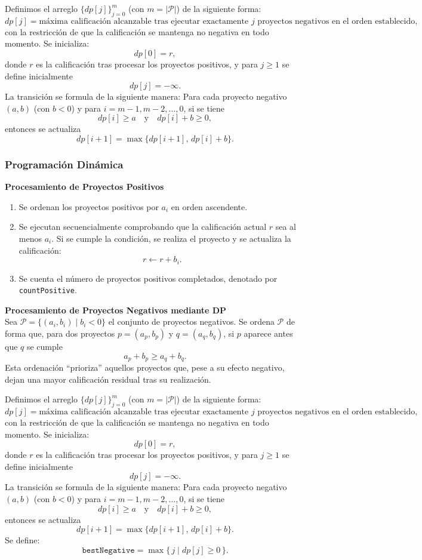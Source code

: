 ﻿\documentclass{article}
\theoremstyle{plain}
\theoremstyle{definition}
\begin{document}
Definimos el arreglo \(\{dp[j]\}_{j=0}^{m}\) (con \(m = |\mathcal{P}|\)) de la siguiente forma:
\[
dp[j] = \text{máxima calificación alcanzable tras ejecutar exactamente } j \text{ proyectos negativos en el orden establecido,}
\]
con la restricción de que la calificación se mantenga no negativa en todo momento. Se inicializa:
\[
dp[0] = r,
\]
donde \(r\) es la calificación tras procesar los proyectos positivos, y para \(j \ge 1\) se define inicialmente
\[
dp[j] = -\infty.
\]
La transición se formula de la siguiente manera: Para cada proyecto negativo \((a,b)\) (con \(b<0\)) y para \(i = m-1, m-2, \dots, 0\), si se tiene
\[
dp[i] \ge a \quad \text{y} \quad dp[i] + b \ge 0,
\]
entonces se actualiza
\[
dp[i+1] = \max\{ dp[i+1],\, dp[i]+b\}.
\]

\subsubsection{Programación Dinámica}

\textbf{Procesamiento de Proyectos Positivos}

\begin{enumerate}
    \item Se ordenan los proyectos positivos por \(a_i\) en orden ascendente.
    \item Se ejecutan secuencialmente comprobando que la calificación actual \(r\) sea al menos \(a_i\). Si se cumple la condición, se realiza el proyecto y se actualiza la calificación:
    \[
    r \leftarrow r + b_i.
    \]
    \item Se cuenta el número de proyectos positivos completados, denotado por \texttt{countPositive}.
    \\
\end{enumerate}

\textbf{Procesamiento de Proyectos Negativos mediante DP}
\\

    Sea \(\mathcal{P} = \{ (a_i,b_i) \mid b_i < 0\}\) el conjunto de proyectos negativos. Se ordena \(\mathcal{P}\) de forma que, para dos proyectos \(p=(a_p,b_p)\) y \(q=(a_q,b_q)\), si \(p\) aparece antes que \(q\) se cumple
\[
a_p+b_p \ge a_q+b_q.
\]
Esta ordenación “prioriza” aquellos proyectos que, pese a su efecto negativo, dejan una mayor calificación residual tras su realización.

Definimos el arreglo \(\{dp[j]\}_{j=0}^{m}\) (con \(m = |\mathcal{P}|\)) de la siguiente forma:
\[
dp[j] = \text{máxima calificación alcanzable tras ejecutar exactamente } j \text{ proyectos negativos en el orden establecido,}
\]
con la restricción de que la calificación se mantenga no negativa en todo momento. Se inicializa:
\[
dp[0] = r,
\]
donde \(r\) es la calificación tras procesar los proyectos positivos, y para \(j \ge 1\) se define inicialmente
\[
dp[j] = -\infty.
\]
La transición se formula de la siguiente manera: Para cada proyecto negativo \((a,b)\) (con \(b<0\)) y para \(i = m-1, m-2, \dots, 0\), si se tiene
\[
dp[i] \ge a \quad \text{y} \quad dp[i] + b \ge 0,
\]
entonces se actualiza
\[
dp[i+1] = \max\{ dp[i+1],\, dp[i]+b\}.
\]
Se define:
\[
\texttt{bestNegative} = \max\{\, j \mid dp[j] \ge 0\,\}.
\]
\end{document}
